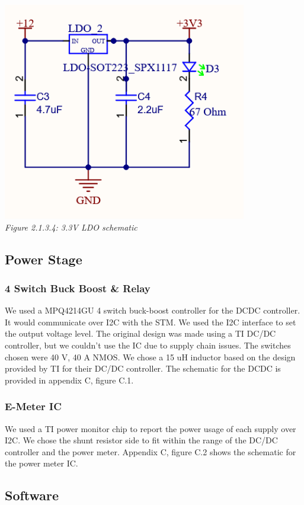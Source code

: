 \begin{center}
    \includegraphics[width=0.8\textwidth]{images/3V3_ldo_schematic.png}\\
    \it Figure 2.1.3.4: 3.3V LDO schematic\\
\end{center}

\subsection{Power Stage}
\subsubsection{4 Switch Buck Boost \& Relay}
We used a MPQ4214GU 4 switch buck-boost controller for the DCDC controller. It would communicate over I2C with the STM.
We used the I2C interface to set the output voltage level.
The original design was made using a TI DC/DC controller, but we couldn't use the IC due to supply chain issues.
The switches chosen were 40 V, 40 A NMOS. We chose a 15 uH inductor based on the design provided by TI for their DC/DC controller.
The schematic for the DCDC is provided in appendix C, figure C.1.

\subsubsection{E-Meter IC}
We used a TI power monitor chip to report the power usage of each supply over I2C.
We chose the shunt resistor side to fit within the range of the DC/DC controller and the power meter.
Appendix C, figure C.2 shows the schematic for the power meter IC.

\subsection{Software}
